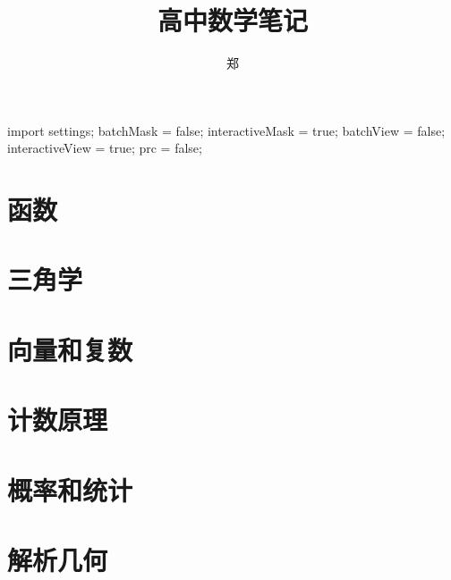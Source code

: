 \documentclass[a4paper, openany, UTF8]{ctexbook}
\title{{\Huge 高中数学笔记}}
\author{郑}
\begin{document}
	\begin{asydef}
		import settings;
		batchMask = false;
		interactiveMask = true;
		batchView = false;
		interactiveView = true;
		prc = false;
	\end{asydef}

	\frontmatter
	\setcounter{tocdepth}{1}
	\maketitle

	

	\tableofcontents
	\clearpage
	\mainmatter
	\raggedbottom

	\part{函数}
	

	\part{三角学}
	
	

	\part{向量和复数}
	

	\part{计数原理}
	
	

	\part{概率和统计}
	

	\part{解析几何}
	
\end{document}
